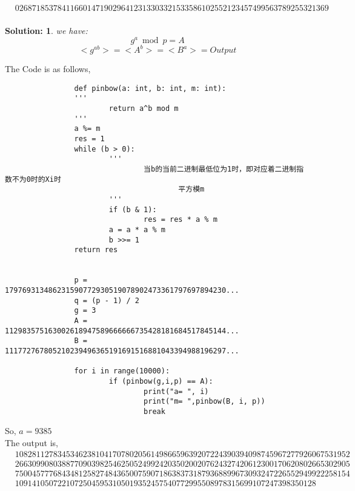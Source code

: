 \documentclass{article}
\theoremstyle{break}
\newtheorem*{solution*}{\textbf{Solution:} }
\begin{document}
\begin{enumerate}
\[\begin{aligned}
                &02687185378411660147190296412313303321533586102552123457499563789255321369\\
        \end{aligned}
        \]
        \vspace{20mm}
        \begin{solution*}
                we have:\\
                        $$g^a \bmod p = A $$
                        $$<g^{ab} >= <A^b >= <B^a>= Output$$ 
        \end{solution*}
        \newpage
        The Code is as follows,\\
        \begin{lstlisting}
                def pinbow(a: int, b: int, m: int):
                '''
                        return a^b mod m
                '''
                a %= m
                res = 1
                while (b > 0):
                        '''
                                当b的当前二进制最低位为1时，即对应着二进制指数不为0时的Xi时
                                        平方模m
                        '''
                        if (b & 1): 
                                res = res * a % m
                        a = a * a % m
                        b >>= 1
                return res


                p = 179769313486231590772930519078902473361797697894230...
                q = (p - 1) / 2
                g = 3
                A = 112983575163002618947589666666735428181684517845144...
                B = 111772767805210239496365191691516881043394988196297...

                for i in range(10000):
                        if (pinbow(g,i,p) == A):
                                print("a= ", i)
                                print("m= ",pinbow(B, i, p))
                                break
        \end{lstlisting}
        So, $a = 9385$\\
        The output is, 
        \[
        \begin{aligned}
                &1082811278345346238104170780205614986659639207224390394098745967277926067531952\\
                &2663099080388770903982546250524992420350200207624327420612300170620802665302905\\
                &7500457776843481258274843650075907186383731879368899673093247226552949922258154\\
                &10914105072210725045953105019352457540772995508978315699107247398350128\\                               
        \end{aligned}        
        \]
\end{enumerate}
\end{document}
